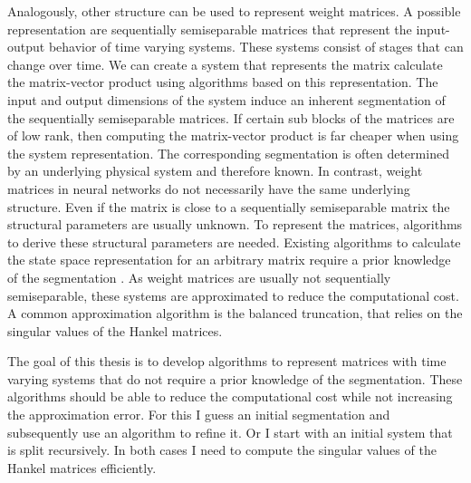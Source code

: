 \documentclass[numbers=noenddot,doctype=mastersthesis,BCOR=15mm,biblatex]{ldvbook}%
\begin{document}
Analogously, other structure can be used to represent weight matrices.
A possible representation are sequentially semiseparable matrices that represent the input-output behavior of time varying systems.
These systems consist of stages that can change over time.
We can create a system that represents the matrix calculate the matrix-vector product using algorithms based on this representation.
The input and output dimensions of the system induce an inherent segmentation of the sequentially semiseparable matrices.
If certain sub blocks of the matrices are of low rank, then computing the matrix-vector product is far cheaper when using the system representation.
The corresponding segmentation is often determined by an underlying physical system and therefore known. 
In contrast, weight matrices in neural networks do not necessarily have the same underlying structure.
Even if the matrix is close to a sequentially semiseparable matrix the structural parameters are usually unknown.
To represent the matrices, algorithms to derive these structural parameters are needed.
Existing algorithms to calculate the state space representation for an arbitrary matrix require a prior knowledge of the segmentation \cite{chandrasekaran_fast_2002}.
As weight matrices are usually not sequentially semiseparable, these systems are approximated to reduce the computational cost.
A common approximation algorithm is the balanced truncation, that relies on the singular values of the Hankel matrices.

The goal of this thesis is to develop algorithms to represent matrices with time varying systems that do not require a prior knowledge of the segmentation.
These algorithms should be able to reduce the computational cost while not increasing the approximation error.
For this I guess an initial segmentation and subsequently use an algorithm to refine it.
Or I start with an initial system that is split recursively.
In both cases I need to compute the singular values of the Hankel matrices efficiently.

\end{document}
